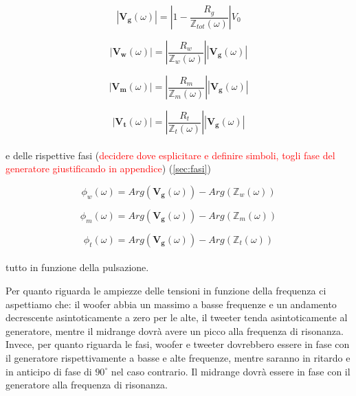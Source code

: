 \documentclass[12pt,italian]{article}
\newcommand{\err}[1]{\textcolor{red}{#1}}
\begin{document}
\begin{equation}
	\left| \mathbf{V_{g}}(\omega) \right| = \left| 1 - \frac{R_g}
	{\mathbb{Z}_{tot}(\omega)}\right| V_{0}
	\label{eq:Vg}
\end{equation}

\begin{equation}
	\left| \mathbf{V_{w}}(\omega) \right| = \left| \frac{R_{w}}
	{\mathbb{Z}_{w}(\omega)}\right|\left| \mathbf{V_{g}}(\omega) \right|
	\label{eq:Vw}
\end{equation}

\begin{equation}
	\left| \mathbf{V_{m}}(\omega) \right| = \left| \frac{R_{m}}
	{\mathbb{Z}_{m}(\omega)}\right|\left| \mathbf{V_{g}}(\omega) \right|
	\label{eq:Vm}
\end{equation}

\begin{equation}
	\left| \mathbf{V_{t}}(\omega) \right| = \left| \frac{R_{t}}
	{\mathbb{Z}_{t}(\omega)}\right|\left| \mathbf{V_{g}}(\omega) \right|
	\label{eq:Vt}
\end{equation}
\\
e delle rispettive fasi (\err{decidere dove esplicitare e definire simboli, togli fase del generatore giustificando in appendice}) (\ref{sec:fasi})

\begin{equation}
	\phi_{w}(\omega) = Arg(\mathbf{V_{g}}(\omega)) - Arg(\mathbb{Z}_{w}(\omega))
\end{equation}

\begin{equation}
	\phi_{m}(\omega) = Arg(\mathbf{V_{g}}(\omega)) - Arg(\mathbb{Z}_{m}(\omega))
\end{equation}

\begin{equation}
	\phi_{t}(\omega) =  Arg(\mathbf{V_{g}}(\omega)) - Arg(\mathbb{Z}_{t}(\omega))
\end{equation}
\\
tutto in funzione della pulsazione.

Per quanto riguarda le ampiezze delle tensioni in funzione della frequenza ci
aspettiamo che: il woofer abbia un massimo a basse frequenze e un andamento
decrescente asintoticamente a zero per le alte, il tweeter tenda
asintoticamente al generatore, mentre il midrange dovrà avere un picco alla
frequenza di risonanza. Invece, per quanto riguarda le fasi, woofer e tweeter
dovrebbero essere in fase con il generatore rispettivamente a basse e alte
frequenze, mentre saranno in ritardo e in anticipo di fase di $90^\circ$ nel
caso contrario. Il midrange dovrà essere in fase con il generatore alla
frequenza di risonanza.
\end{document}
